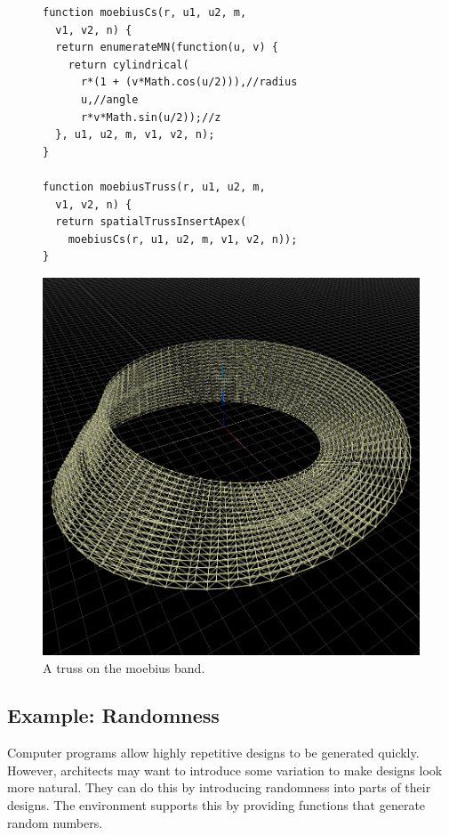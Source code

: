 \begin{figure}
\begin{minipage}{0.5\textwidth}
\begin{verbatim}
function moebiusCs(r, u1, u2, m,
  v1, v2, n) {
  return enumerateMN(function(u, v) {
    return cylindrical(
      r*(1 + (v*Math.cos(u/2))),//radius
      u,//angle
      r*v*Math.sin(u/2));//z
  }, u1, u2, m, v1, v2, n);
}

function moebiusTruss(r, u1, u2, m,
  v1, v2, n) {
  return spatialTrussInsertApex(
    moebiusCs(r, u1, u2, m, v1, v2, n));
}
\end{verbatim}
\end{minipage}%
\begin{minipage}{0.5\textwidth}
  \includegraphics[width=1.0\textwidth]{./images/detail_examples/moebius_truss_crop}
\end{minipage}
\caption{A truss on the moebius band.}
\label{fig:truss:moebius}
\end{figure}


\subsection{Example: Randomness}
Computer programs allow highly repetitive designs to be generated quickly.
However, architects may want to introduce some variation to make designs look more natural.
They can do this by introducing randomness into parts of their designs.
The environment supports this by providing functions that generate random numbers.

